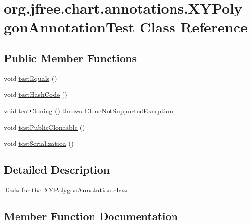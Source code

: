 \hypertarget{classorg_1_1jfree_1_1chart_1_1annotations_1_1_x_y_polygon_annotation_test}{}\section{org.\+jfree.\+chart.\+annotations.\+X\+Y\+Polygon\+Annotation\+Test Class Reference}
\label{classorg_1_1jfree_1_1chart_1_1annotations_1_1_x_y_polygon_annotation_test}
\subsection*{Public Member Functions}
\begin{DoxyCompactItemize}
\item 
void \mbox{\hyperlink{classorg_1_1jfree_1_1chart_1_1annotations_1_1_x_y_polygon_annotation_test_a8bf1df6e921a847badfc946df53ea472}{test\+Equals}} ()
\item 
void \mbox{\hyperlink{classorg_1_1jfree_1_1chart_1_1annotations_1_1_x_y_polygon_annotation_test_ac9314a9552266e53e3a8ec2f5e5085d3}{test\+Hash\+Code}} ()
\item 
void \mbox{\hyperlink{classorg_1_1jfree_1_1chart_1_1annotations_1_1_x_y_polygon_annotation_test_a3ac439be63204c628cf267ccd9496303}{test\+Cloning}} ()  throws Clone\+Not\+Supported\+Exception 
\item 
void \mbox{\hyperlink{classorg_1_1jfree_1_1chart_1_1annotations_1_1_x_y_polygon_annotation_test_aa12fb7f73bbcf66859aa1363c2b8ef54}{test\+Public\+Cloneable}} ()
\item 
void \mbox{\hyperlink{classorg_1_1jfree_1_1chart_1_1annotations_1_1_x_y_polygon_annotation_test_a123d5558197db6da899297b750ade2de}{test\+Serialization}} ()
\end{DoxyCompactItemize}


\subsection{Detailed Description}
Tests for the \mbox{\hyperlink{classorg_1_1jfree_1_1chart_1_1annotations_1_1_x_y_polygon_annotation}{X\+Y\+Polygon\+Annotation}} class. 

\subsection{Member Function Documentation}
\mbox{\label{classorg_1_1jfree_1_1chart_1_1annotations_1_1_x_y_polygon_annotation_test_a3ac439be63204c628cf267ccd9496303}} 
